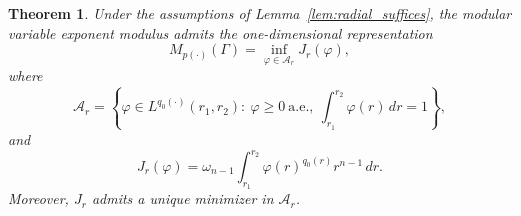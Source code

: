 \documentclass[12pt]{amsart}
\numberwithin{equation}{section}
\theoremstyle{plain}
\newtheorem{theorem}[equation]{Theorem}
\theoremstyle{definition}
\begin{document}
\begin{theorem}
\label{thm:1d_modulus}
Under the assumptions of Lemma~\ref{lem:radial_suffices}, the modular
variable exponent modulus admits the one-dimensional representation
\begin{equation}
\label{eq:annulus_1d_reduction}
M_{p(\cdot)}(\Gamma)
=
\inf_{\varphi\in\mathcal A_r} J_r(\varphi),
\end{equation}
where
\begin{equation}
\label{eq:annulus_admissible_class}
\mathcal A_r
=
\left\{
\varphi\in L^{q_0(\cdot)}(r_1,r_2):
\ \varphi\ge0\ \text{a.e.},\
\int_{r_1}^{r_2}\varphi(r)\,dr=1
\right\},
\end{equation}
and
\begin{equation}
\label{eq:annulus_1d_energy}
J_r(\varphi)
=
\omega_{n-1}
\int_{r_1}^{r_2}
\varphi(r)^{q_0(r)}r^{n-1}\,dr.
\end{equation}
Moreover, $J_r$ admits a unique minimizer in $\mathcal A_r$.
\end{theorem}
\end{document}
